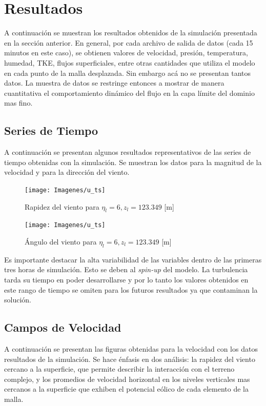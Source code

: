 \chapter{Resultados}
A continuación se muestran los resultados obtenidos de la simulación presentada en la sección anterior. En general, por cada archivo de salida de datos (cada 15 minutos en este caso), se obtienen valores de velocidad, presión, temperatura, humedad, TKE, flujos superficiales, entre otras cantidades que utiliza el modelo en cada punto de la malla desplazada. Sin embargo acá no se presentan tantos datos. La muestra de datos se restringe entonces a mostrar de manera cuantitativa el comportamiento dinámico del flujo en la capa límite del dominio mas fino.
\section{Series de Tiempo}
A continuación se presentan algunos resultados representativos de las series de tiempo obtenidas con la simulación. Se muestran los datos para la magnitud de la velocidad y para la dirección del viento.

\begin{figure}[H]
	\centering
	\texttt{[image: Imagenes/u\_ts]}
	\caption{Rapidez del viento para $\eta_l=6, z_l=123.349$ [m]}
	\label{ts_rap}
\end{figure}

\begin{figure}[H]
	\centering
	\texttt{[image: Imagenes/u\_ts]}
	\caption{Ángulo del viento para $\eta_l=6, z_l=123.349$ [m]}
	\label{ts_ang}
\end{figure}

Es importante destacar la alta variabilidad de las variables dentro de las primeras tres horas de simulación. Esto se deben al \emph{spin-up} del modelo. La turbulencia tarda su tiempo en poder desarrollarse y por lo tanto los valores obtenidos en este rango de tiempo se omiten para los futuros resultados ya que contaminan la solución.
\section{Campos de Velocidad}
A continuación se presentan las figuras obtenidas para la velocidad con los datos resultados de la simulación. Se hace énfasis en dos análisis: la rapidez del viento cercano a la superficie, que permite describir la interacción con el terreno complejo, y los promedios de velocidad horizontal en los niveles verticales mas cercanos a la superficie que exhiben el potencial eólico de cada elemento de la malla.
